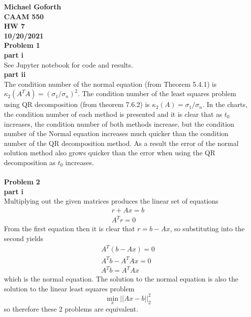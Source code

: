 \documentclass{article} %
\begin{document}
\textbf{Michael Goforth} \\
\textbf{CAAM 550} \\
\textbf{HW 7} \\
\textbf{10/20/2021} \\ 

\textbf{Problem 1} \\
\textbf{part i} \\
See Jupyter notebook for code and results.
\\

\textbf{part ii} \\
The condition number of the normal equation (from Theorem 5.4.1) is $\kappa_2 (A^T A) = (\sigma_1 / \sigma_n)^2$.  The condition number of the least squares problem using QR decomposition (from theorem 7.6.2) is $\kappa_2 (A) = \sigma_1 / \sigma_n$.   In the charts, the condition number of each method is presented and it is clear that as $t_0$ increases, the condition number of both methods increase, but the condition number of the Normal equation increases much quicker than the condition number of the QR decomposition method. As a result the error of the normal solution method also grows quicker than the error when using the QR decomposition as $t_0$ increases.
\\
\\


\textbf{Problem 2} \\
\textbf{part i} \\
Multiplying out the given matrices produces the linear set of equations
\begin{align*}
r + Ax = b \\
A^T r = 0
\end{align*}
From the first equation then it is clear that $r = b - Ax$, so substituting into the second yields
\begin{align*}
A^T (b - Ax) = 0 \\
A^T b - A^T A x = 0 \\
A^T b = A^T A x
\end{align*}
which is the normal equation. The solution to the normal equation is also the solution to the linear least squares problem 
\begin{equation*}
\min_x||Ax - b||^2_2  
\end{equation*}
so therefore these 2 problems are equivalent.
\\
\end{document}
